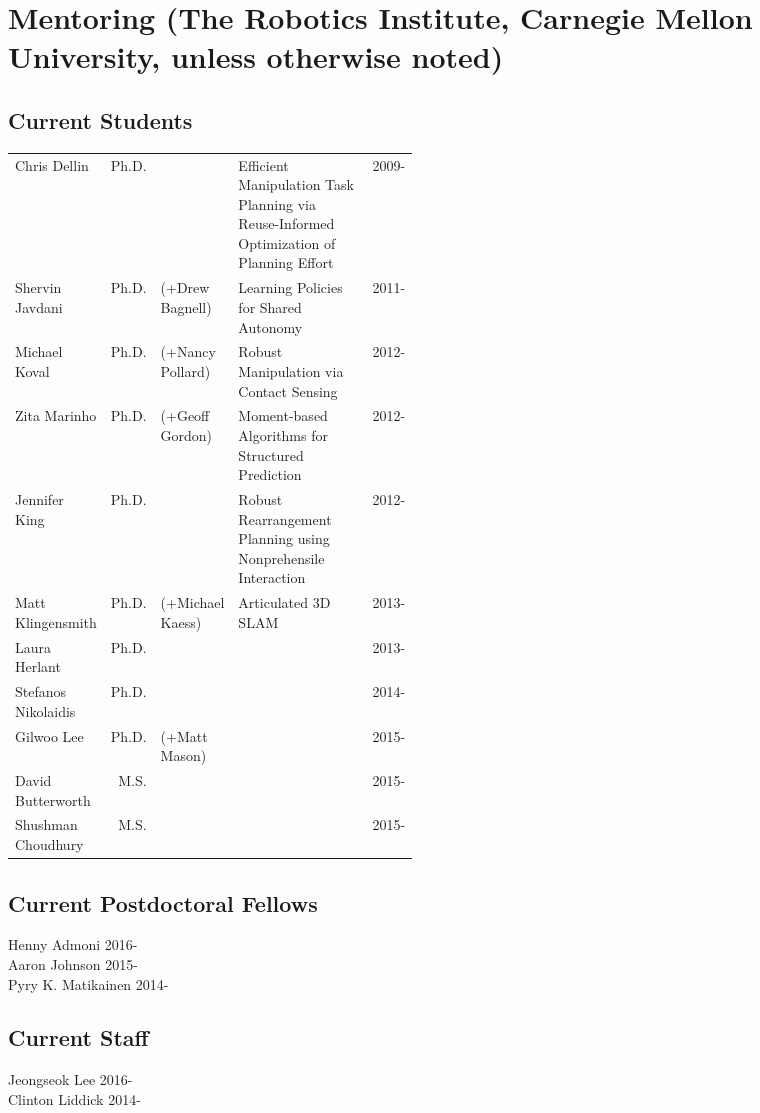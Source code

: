 

\section{Mentoring (The Robotics Institute, Carnegie Mellon University, unless otherwise noted)} 
\subsection{Current Students}
\vspace{-1em}
\begin{center}
\begin{tabular}{lrlp{0.47\linewidth}l}
Chris Dellin & Ph.D.  & & Efficient Manipulation Task Planning via Reuse-Informed Optimization of Planning Effort &2009-\\
Shervin Javdani & Ph.D. &(+Drew Bagnell) & Learning Policies for Shared Autonomy & 2011-\\
Michael Koval & Ph.D. &(+Nancy Pollard) & Robust Manipulation via Contact Sensing & 2012-\\ 
Zita Marinho & Ph.D. &(+Geoff Gordon) & Moment-based Algorithms for Structured Prediction & 2012-\\
Jennifer King & Ph.D. & & Robust Rearrangement Planning using Nonprehensile Interaction & 2012-\\ 
Matt Klingensmith & Ph.D. &(+Michael Kaess) & Articulated 3D SLAM & 2013-\\
Laura Herlant & Ph.D. & & & 2013-\\
Stefanos Nikolaidis & Ph.D. & & & 2014-\\
Gilwoo Lee & Ph.D. & (+Matt Mason) & & 2015-\\
David Butterworth & M.S. & & & 2015-\\
Shushman Choudhury & M.S. & & & 2015-\\

\end{tabular}
\end{center}

\subsection{Current Postdoctoral Fellows}
\noindent
Henny Admoni \hfill 2016-\\
Aaron Johnson \hfill 2015-\\
Pyry K. Matikainen \hfill 2014-\\

\subsection{Current Staff}
\noindent
Jeongseok Lee \hfill 2016-\\
Clinton Liddick \hfill 2014-\\

